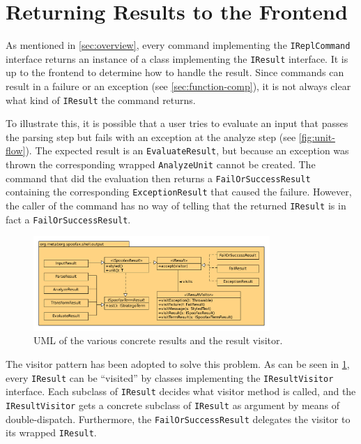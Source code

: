 \section{Returning Results to the Frontend}
\label{sec:visitor}

As mentioned in \cref{sec:overview}, every command implementing the
\texttt{IReplCommand} interface returns an instance of a class implementing
the \texttt{IResult} interface. It is up to the frontend to determine how to
handle the result. Since commands can result in a failure or an exception (see
\cref{sec:function-comp}), it is not always clear what kind of
\texttt{IResult} the command returns.

To illustrate this, it is possible that a user tries to evaluate an input that
passes the parsing step but fails with an exception at the analyze step (see
\cref{fig:unit-flow}). The expected result is an \texttt{EvaluateResult},
but because an exception was thrown the corresponding wrapped
\texttt{AnalyzeUnit} cannot be created. The command that did the evaluation
then returns a \texttt{FailOrSuccessResult} containing the corresponding
\texttt{ExceptionResult} that caused the failure. However, the caller of the
command has no way of telling that the returned \texttt{IResult} is in fact a
\texttt{FailOrSuccessResult}.

\begin{figure}[t]
  \centering
  \includegraphics[width=0.8\textwidth]{uml-visitor}
  \caption{UML of the various concrete results and the result visitor.}
  \label{fig:uml-visitor}
\end{figure}

The visitor pattern has been adopted to solve this problem. As can be seen in
\cref{fig:uml-visitor}, every \texttt{IResult} can be ``visited'' by classes
implementing the \texttt{IResultVisitor} interface. Each subclass of
\texttt{IResult} decides what visitor method is called, and the
\texttt{IResultVisitor} gets a concrete subclass of \texttt{IResult} as argument
by means of double-dispatch. Furthermore, the \texttt{FailOrSuccessResult}
delegates the visitor to its wrapped \texttt{IResult}.

